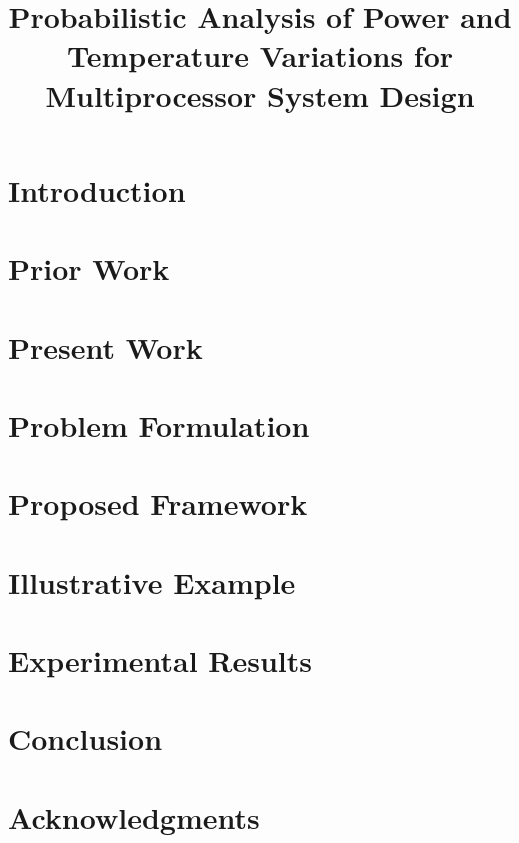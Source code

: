 \documentclass[journal]{IEEEtran}
\begin{document}
  \title{Probabilistic Analysis of Power and Temperature Variations for Multiprocessor System Design}

  \author{
    
  }

  \maketitle

  \begin{abstract}
    
  \end{abstract}

  \section{Introduction} 
  

  \section{Prior Work} 
  

  \section{Present Work} 
  

  \section{Problem Formulation} 
  

  \section{Proposed Framework} 
  

  \section{Illustrative Example} 
  

  \section{Experimental Results} 
  

  \section{Conclusion} 
  

  \section*{Acknowledgments}
  

  \printbibliography

  \appendix
  
\end{document}
